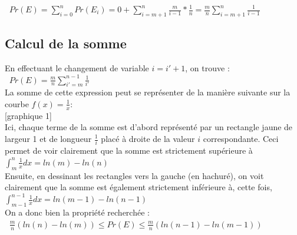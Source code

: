 \documentclass[a4paper,10pt]{article}
\begin{document}
\begin{math}\;\;Pr(E) = \sum_{i=0}^n Pr(E_i) = 0 + \sum_{i=m+1}^n \frac{m}{i-1} * \frac{1}{n} = \frac{m}{n} \sum_{i=m+1}^{n} \frac{1}{i-1}\end{math}

\subsection{Calcul de la somme}

En effectuant le changement de variable
\begin{math}i = i'+1\end{math},
on trouve :\\

\begin{math}\;\;Pr(E) = \frac{m}{n} \sum_{i'=m}^{n-1} \frac{1}{i'}\end{math}\\

La somme de cette expression peut se représenter de la manière suivante sur la courbe
\begin{math}f(x) = \frac{1}{x}\end{math}:\\

[graphique 1]\\

Ici, chaque terme de la somme est d'abord représenté par un rectangle jaune de largeur 1 et de longueur
\begin{math}\frac{1}{i}\end{math}
placé à droite de la valeur
\begin{math}i\end{math} correspondante. Ceci permet de voir clairement que la somme est strictement supérieure à
\begin{math}\int_m^n \frac{1}{x} dx = ln(m) - ln(n)\end{math}\\

Ensuite, en dessinant les rectangles vers la gauche (en hachuré), on voit clairement que la somme est également strictement
inférieure à, cette fois, 
\begin{math}\int_{m-1}^{n-1} \frac{1}{x} dx = ln(m-1) - ln(n-1)\end{math}\\

On a donc bien la propriété recherchée :\\

\begin{math}\;\;\frac{m}{n} (ln(n) - ln(m)) \leq Pr(E) \leq \frac{m}{n} (ln(n-1) - ln(m-1))\end{math}\\
\end{document}

